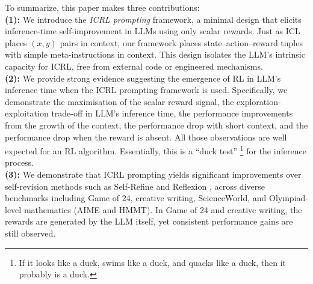 \documentclass{article} %
\newcommand{\0}{\mathbf{0}}
\begin{document}
To summarize,
this paper makes three contributions: \\
\textbf{(1):} We introduce the \emph{ICRL prompting} framework, a minimal design that elicits inference-time self-improvement in LLMs using only scalar rewards. Just as ICL places $(x, y)$ pairs in context, our framework places state–action–reward tuples with simple meta-instructions in context. This design isolates the LLM’s intrinsic capacity for ICRL, free from external code or engineered mechanisms. \\
\textbf{(2):} We provide strong evidence suggesting the emergence of RL in LLM's inference time when the ICRL prompting framework is used.
  Specifically, we demonstrate the maximisation of the scalar reward signal,
  the exploration-exploitation trade-off in LLM's inference time,
  the performance improvements from the growth of the context,
  the performance drop with short context,
  and the performance drop when the reward is absent.
  All those observations are well expected for an RL algorithm.
  Essentially, this is a ``duck test'' \citep{heim2007exploringindiana}\footnote{If it looks like a duck, swims like a duck, and quacks like a duck, then it probably is a duck.} for the inference process. \\
\textbf{(3):} 
We demonstrate that ICRL prompting yields significant improvements over self-revision methods such as Self-Refine \citep{self-refine} and Reflexion \citep{shinn2023reflexion}, across diverse benchmarks including Game of 24, creative writing, ScienceWorld, and Olympiad-level mathematics (AIME and HMMT). In Game of 24 and creative writing, the rewards are generated by the LLM itself, yet consistent performance gains are still observed. 
\end{document}
